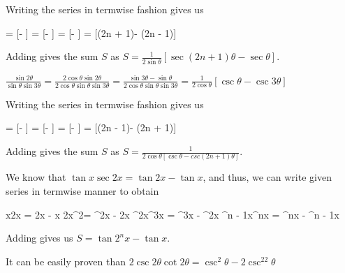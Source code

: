   Writing the series in termwise fashion gives us

  \startformula\startalign
    \NC {} \NC = [\theta - \sec\theta]\NR
    \NC {} \NC = [\theta - \theta]\NR
    \NC {} \NC = [\theta - \theta]\NR
    \NC\NC \cdots \NR
    \NC {} \NC = [\sec(2n +
      1)\theta - \sec(2n - 1)\theta]\NR
  \stopalign\stopformula

  Adding gives the sum $S$ as $S = \frac{1}{2\sin\theta}[\sec(2n + 1)\theta - \sec\theta]$.
\item $\frac{\sin2\theta}{\sin\theta\sin3\theta} =
  \frac{2\cos\theta\sin2\theta}{2\cos\theta\sin\theta\sin3\theta} = \frac{\sin3\theta -
    \sin\theta}{2\cos\theta\sin\theta\sin3\theta} = \frac{1}{2\cos\theta}[\csc\theta - \csc3\theta]$

  Writing the series in termwise fashion gives us

  \startformula\startalign
    \NC {}\NC = [\csc\theta - \theta]\NR
    \NC {}\NC = [\theta - \theta]\NR
    \NC {}\NC = [\theta - \theta]\NR
    \NC\NC \cdots\NR
    \NC {}\NC = [\csc(2n -
      1)\theta - \csc(2n + 1)\theta]\NR
  \stopalign\stopformula

  Adding gives the sum $S$ as $S = \frac{1}{2\cos\theta[\csc\theta - csc(2n + 1)\theta]}$.
\item We know that $\tan x\sec2x = \tan2x - \tan x$, and thus, we can write given series in termwise manner
  to obtain

  \startformula\startalign
    \NC \tan x\sec2x \NC = \tan2x - \tan x\NR
    \NC \tan2x^2\NC = ^2x - \tan2x\NR
    \NC {}^2x^3x \NC = ^3x - ^2x\NR
    \NC\NC \cdots\NR
    \NC {}^{n - 1}x^nx \NC = ^nx - ^{n - 1}x\NR
  \stopalign\stopformula

  Adding gives us $S = \tan2^nx - \tan x$.
\item It can be easily proven than $2\csc2\theta\cot2\theta = \csc^2\theta - 2\csc^22\theta$

